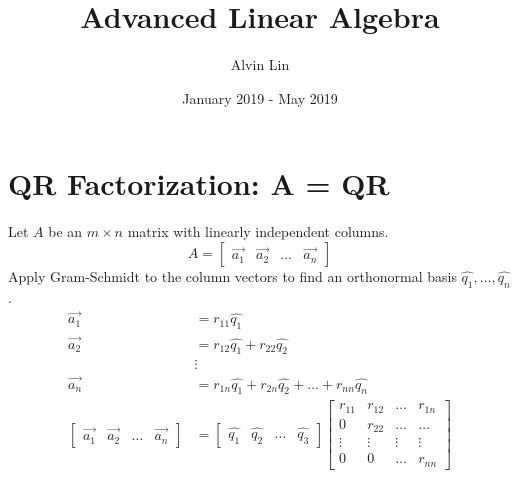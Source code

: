 \documentclass{math}
\title{Advanced Linear Algebra}
\author{Alvin Lin}
\date{January 2019 - May 2019}
\begin{document}
\maketitle

\section*{QR Factorization: A = QR}
Let \( A \) be an \( m\times n \) matrix with linearly independent columns.
\[ A = \begin{bmatrix}\vec{a_1} & \vec{a_2} & \dots & \vec{a_n}\end{bmatrix} \]
Apply Gram-Schmidt to the column vectors to find an orthonormal basis
\( \hat{q_1},\dots,\hat{q_n} \).
\begin{align*}
  \vec{a_1} &= r_{11}\hat{q_1} \\
  \vec{a_2} &= r_{12}\hat{q_1}+r_{22}\hat{q_2} \\
  & \vdots \\
  \vec{a_n} &= r_{1n}\hat{q_1}+r_{2n}\hat{q_2}+\dots+r_{nn}\hat{q_n} \\
  \begin{bmatrix}\vec{a_1} & \vec{a_2} & \dots & \vec{a_n}\end{bmatrix} &=
    \begin{bmatrix}\hat{q_1} & \hat{q_2} & \dots & \hat{q_3}\end{bmatrix}
    \begin{bmatrix}
      r_{11} & r_{12} & \dots & r_{1n} \\
      0 & r_{22} & \dots & \dots \\
      \vdots & \vdots & \vdots & \vdots \\
      0 & 0 & \dots & r_{nn}
    \end{bmatrix}
\end{align*}
\end{document}
